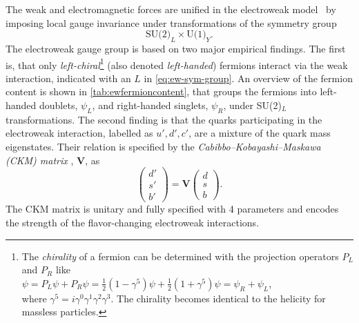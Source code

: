 The weak and electromagnetic forces are unified in the electroweak model~\cite{GLASHOW1961579,SALAM1964168,PhysRevLett.19.1264} by imposing local gauge invariance under transformations of the symmetry group
\begin{equation}
  \label{eq:ew-sym-group}
  \text{SU(2)}_L \times \text{U(1)}_Y.
\end{equation}
The electroweak gauge group is based on two major empirical findings.
The first is, that only \emph{left-chiral}\footnote{
  The \emph{chirality} of a fermion can be determined with the projection operators $P_L$ and $P_R$ like \\
  $\psi = P_L \psi + P_R \psi = \frac{1}{2} \left( 1 - \gamma^5 \right) \psi + \frac{1}{2} \left( 1 + \gamma^5 \right) \psi = \psi_R + \psi_L$, \\
  where $\gamma^5 = i\gamma^0\gamma^1\gamma^2\gamma^3$. The chirality becomes identical to the helicity for massless particles.} (also denoted \emph{left-handed}) fermions interact via the weak interaction, indicated with an $L$ in \cref{eq:ew-sym-group}. An overview of the fermion content is shown in \cref{tab:ewfermioncontent}, that groups the fermions into left-handed doublets, $\psi_L$, and right-handed singlets, $\psi_R$, under SU(2)$_L$ transformations.
The second finding is that the quarks participating in the electroweak interaction, labelled as $u', d', c'$, are a mixture of the quark mass eigenstates. Their relation is specified by the \emph{Cabibbo–Kobayashi–Maskawa (CKM) matrix} \cite{doi:10.1143/PTP.49.652}, $\pmb{V}$, as
\begin{equation}
  \begin{pmatrix}
    d' \\
    s' \\
    b'
  \end{pmatrix}
  =
  \pmb{V}
  \begin{pmatrix}
    d \\
    s \\
    b
  \end{pmatrix}.
\end{equation}
The CKM matrix is unitary and fully specified with 4 parameters and encodes the strength of the flavor-changing electroweak interactions.

